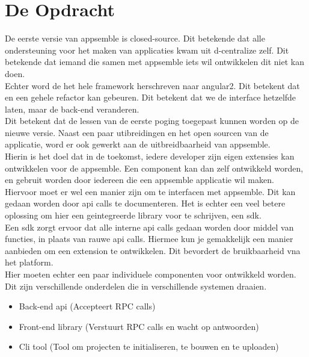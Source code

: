 \chapter{De Opdracht}

De eerste versie van appsemble is closed-source. Dit betekende dat alle ondersteuning voor het maken van applicaties kwam uit d-centralize zelf. Dit betekende dat iemand die samen met appsemble iets wil ontwikkelen dit niet kan doen. \\

Echter word de het hele framework herschreven naar angular2. Dit betekent dat en een gehele refactor kan gebeuren. Dit betekent dat we de interface hetzelfde laten, maar de back-end veranderen.\\

Dit betekent dat de lessen van de eerste poging toegepast kunnen worden op de nieuwe versie. Naast een paar utibreidingen en het open sourcen van de applicatie, word er ook gewerkt aan de uitbreidbaarheid van appsemble.\\

Hierin is het doel dat in de toekomst, iedere developer zijn eigen extensies kan ontwikkelen voor de appsemble. Een component kan dan zelf ontwikkeld worden, en gebruit worden door iedereen die een appsemble applicatie wil maken.\\

Hiervoor moet er wel een manier zijn om te interfacen met appsemble. Dit kan gedaan worden door api calls te documenteren. Het is echter een veel betere oplossing om hier een geintegreerde library voor te schrijven, een sdk.\\

Een sdk zorgt ervoor dat alle interne api calls gedaan worden  door middel van functies, in plaats van rauwe api calls. Hiermee kun je gemakkelijk een manier aanbieden om een extension te ontwikkelen. Dit bevordert de bruikbaarheid vna het platform.\\

Hier moeten echter een paar individuele componenten voor ontwikkeld worden. Dit zijn verschillende onderdelen die in verschillende systemen draaien. \\

\begin{itemize}
	\item Back-end api (Accepteert RPC calls)
	\item Front-end library (Verstuurt RPC calls en wacht op antwoorden)
	\item Cli tool (Tool om projecten te initialiseren, te bouwen en te uploaden)
\end{itemize}

